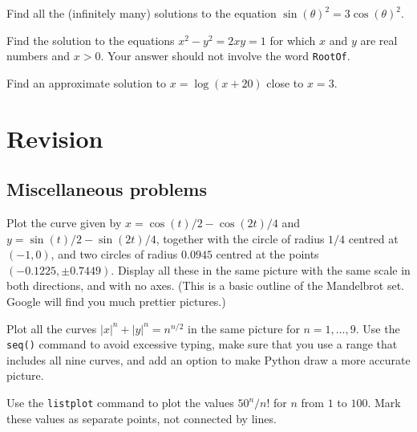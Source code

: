 \documentclass[a4paper,10pt]{amsbook}
\begin{document}
\begin{exercise}
 Find all the (infinitely many) solutions to the equation
 $\sin(\theta)^2=3\cos(\theta)^2$. 
\end{exercise}

\begin{exercise}
 Find the solution to the equations $x^2-y^2=2xy=1$ for
 which $x$ and $y$ are real numbers and $x>0$.  Your answer
 should not involve the word \verb~RootOf~. 
\end{exercise}

\begin{exercise}
 Find an approximate solution to $x=\log(x+20)$ close to
 $x=3$.  
\end{exercise}

\chapter{Revision} 

\section{Miscellaneous problems}

\begin{exercise}
 Plot the curve given by $x=\cos(t)/2-\cos(2t)/4$ and
 $y=\sin(t)/2-\sin(2t)/4$, together with the circle of radius $1/4$
 centred at $(-1,0)$, and two circles of radius $0.0945$ centred at
 the points $(-0.1225,\pm 0.7449)$.  Display all these in the same
 picture with the same scale in both directions, and with no axes.
 (This is a basic outline of the Mandelbrot set.  Google will find you
 much prettier pictures.)
\end{exercise}

\begin{exercise}
 Plot all the curves $|x|^n+|y|^n=n^{n/2}$ in the same picture for
 $n=1,\dotsc,9$.  Use the \verb~seq()~ command to avoid excessive
 typing, make sure that you use a range that includes all nine curves,
 and add an option to make Python draw a more accurate picture.
\end{exercise}

\begin{exercise}
 Use the \verb~listplot~ command to plot the values $50^n/n!$ for $n$
 from $1$ to $100$.  Mark these values as separate points, not
 connected by lines.
\end{exercise}
\end{document}
